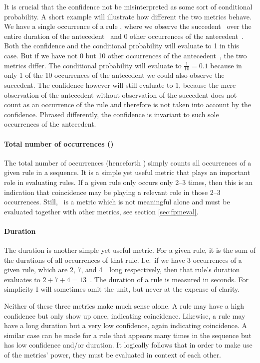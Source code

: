 It is crucial that the confidence not be misinterpreted as some sort of conditional probability.
A short example will illustrate how different the two metrics behave.
We have a single occurrence of a rule , where we observe the succedent~ over the entire duration of the antecedent~ and 0 other occurrences of the antecedent~.
Both the confidence and the conditional probability will evaluate to 1 in this case.
But if we have not 0 but 10 other occurrences of the antecedent~, the two metrics differ.
The conditional probability will evaluate to \(\frac{1}{10} = 0.1\) because in only 1 of the 10 occurrences of the antecedent we could also observe the succedent.
The confidence however will still evaluate to 1, because the mere observation of the antecedent without observation of the succedent does not count as an occurrence of the rule  and therefore is not taken into account by the confidence.
Phrased differently, the confidence is invariant to such sole occurrences of the antecedent.

\paragraph{Total number of occurrences (\noc)}
The total number of occurrences (henceforth \noc) simply counts all occurrences of a given rule in a sequence.
It is a simple yet useful metric that plays an important role in evaluating rules.
If a given rule only occurs only 2--3 times, then this is an indication that coincidence may be playing a relevant role in those 2--3 occurrences.
Still, \noc\ is a metric which is not meaningful alone and must be evaluated together with other metrics, see section \ref{sec:fpmeval}.

\paragraph{Duration}
The duration is another simple yet useful metric.
For a given rule, it is the sum of the durations of all occurrences of that rule.
I.e.~if we have 3 occurrences of a given rule, which are 2, 7, and 4~\s\ long respectively, then that rule's duration evaluates to \(2+7+4=13\)~\s.
The duration of a rule is measured in seconds.
For simplicity I will sometimes omit the unit, but never at the expense of clarity.

Neither of these three metrics make much sense alone.
A rule may have a high confidence but only show up once, indicating coincidence.
Likewise, a rule may have a long duration but a very low confidence, again indicating coincidence.
A similar case can be made for a rule that appears many times in the sequence but has low confidence and/or duration.
It logically follows that in order to make use of the metrics' power, they must be evaluated in context of each other.

